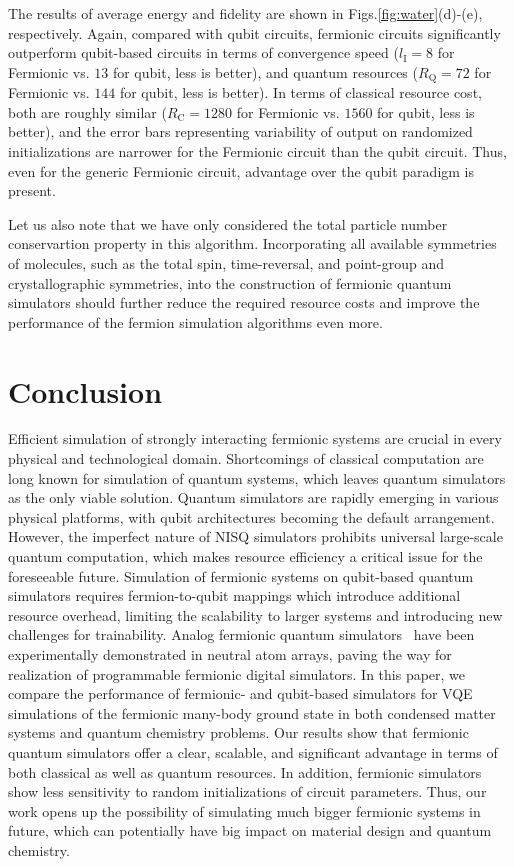 \documentclass[aps, pra, reprint, superscriptaddress]{revtex4-1}
\begin{document}
The results of average energy and fidelity are shown in Figs.\ref{fig:water}(d)-(e), respectively. Again, compared with qubit circuits, fermionic circuits significantly outperform qubit-based circuits in terms of convergence speed ($l_\text{I}= 8$ for Fermionic vs. $13$ for qubit, less is better), and quantum resources ($R_\text{Q}= 72$ for Fermionic vs. $144$ for qubit, less is better). In terms of classical resource cost, both are roughly similar ($R_\text{C}= 1280$ for Fermionic vs. $1560$ for qubit, less is better), and the error bars representing variability of output on randomized initializations are narrower for the Fermionic circuit than the qubit circuit. Thus, even for the generic Fermionic circuit, advantage over the qubit paradigm is present.   
 
Let us also note that we have only considered the total particle number conservartion property in this algorithm. Incorporating all available symmetries of molecules, such as the total spin, time-reversal, and point-group and crystallographic symmetries, into the construction of fermionic quantum simulators should further reduce the required resource costs and improve the performance of the fermion simulation algorithms even more. 

\section{Conclusion}
\label{sec:conclusion}
Efficient simulation of strongly interacting fermionic systems are crucial in every physical and technological domain. Shortcomings of classical computation are long known for simulation of quantum systems, which leaves quantum simulators as the only viable solution. Quantum simulators are rapidly emerging in various physical platforms, with qubit architectures becoming the default arrangement. However, the imperfect nature of NISQ simulators prohibits universal large-scale quantum computation, which makes resource efficiency a critical issue for the foreseeable future. Simulation of fermionic systems on qubit-based quantum simulators requires fermion-to-qubit mappings which introduce additional resource overhead, limiting the scalability to larger systems and introducing new challenges for trainability. 
Analog fermionic quantum simulators~\cite{spar2022realization,yan2022two} have been experimentally demonstrated in neutral atom arrays, paving the way for realization of programmable fermionic digital simulators. In this paper, we compare the performance of fermionic- and qubit-based simulators for VQE simulations of the fermionic many-body ground state in both condensed matter systems and quantum chemistry problems. Our results show that fermionic quantum simulators offer a clear, scalable, and significant advantage in terms of both classical as well as quantum resources. In addition, fermionic simulators show less sensitivity to random initializations of circuit parameters. Thus, our work opens up the possibility of simulating much bigger fermionic systems in future, which can potentially have big impact on material design and quantum chemistry. \\
\end{document}
